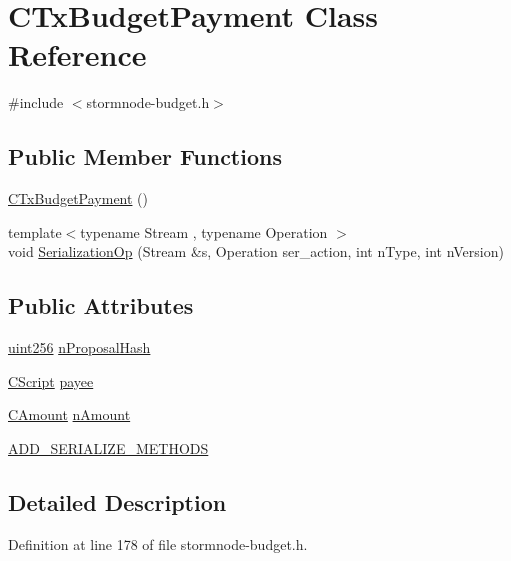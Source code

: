 \hypertarget{class_c_tx_budget_payment}{}\section{C\+Tx\+Budget\+Payment Class Reference}
\label{class_c_tx_budget_payment}


{\ttfamily \#include $<$stormnode-\/budget.\+h$>$}

\subsection*{Public Member Functions}
\begin{DoxyCompactItemize}
\item 
\hyperlink{class_c_tx_budget_payment_ad13df26d250f5233f218dd4305c78424}{C\+Tx\+Budget\+Payment} ()
\item 
{\footnotesize template$<$typename Stream , typename Operation $>$ }\\void \hyperlink{class_c_tx_budget_payment_a31bd09c40afac565c4cc2dfd48a5b564}{Serialization\+Op} (Stream \&s, Operation ser\+\_\+action, int n\+Type, int n\+Version)
\end{DoxyCompactItemize}
\subsection*{Public Attributes}
\begin{DoxyCompactItemize}
\item 
\hyperlink{classuint256}{uint256} \hyperlink{class_c_tx_budget_payment_a288dd5a0cd2ba5761d688b77dae5b375}{n\+Proposal\+Hash}
\item 
\hyperlink{class_c_script}{C\+Script} \hyperlink{class_c_tx_budget_payment_a503a9395a6f3ff0e1d81104a3dbf5697}{payee}
\item 
\hyperlink{amount_8h_a4eaf3a5239714d8c45b851527f7cb564}{C\+Amount} \hyperlink{class_c_tx_budget_payment_ac127187725282a338d140efe8ee2c4a7}{n\+Amount}
\item 
\hyperlink{class_c_tx_budget_payment_a27f26b8d9973aa88f7b6bf2e908258ce}{A\+D\+D\+\_\+\+S\+E\+R\+I\+A\+L\+I\+Z\+E\+\_\+\+M\+E\+T\+H\+O\+D\+S}
\end{DoxyCompactItemize}


\subsection{Detailed Description}


Definition at line 178 of file stormnode-\/budget.\+h.



